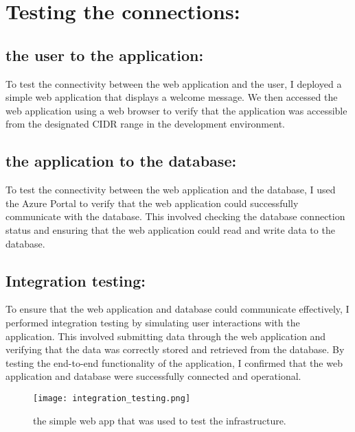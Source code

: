 \section{Testing the connections:}
\subsection*{the user to the application:}
To test the connectivity between the web application and the user, I deployed a simple web application that displays a welcome message. We then accessed the web application using a web browser to verify that the application was accessible from the designated CIDR range in the development environment.
\subsection*{the application to the database:}
To test the connectivity between the web application and the database, I used the Azure Portal to verify that the web application could successfully communicate with the database. This involved checking the database connection status and ensuring that the web application could read and write data to the database.
\subsection*{Integration testing:}
To ensure that the web application and database could communicate effectively, I performed integration testing by simulating user interactions with the application. This involved submitting data through the web application and verifying that the data was correctly stored and retrieved from the database. By testing the end-to-end functionality of the application, I confirmed that the web application and database were successfully connected and operational.
\begin{figure}[htpb]
    \centering
    \texttt{[image: integration\_testing.png]}
    \caption{the simple web app that was used to test the infrastructure.}
    \label{fig:testing}
\end{figure}

